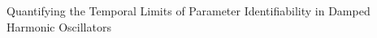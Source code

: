 \documentclass[]{article}
\begin{document}
Quantifying the Temporal Limits of Parameter Identifiability in Damped Harmonic Oscillators
\end{document}
